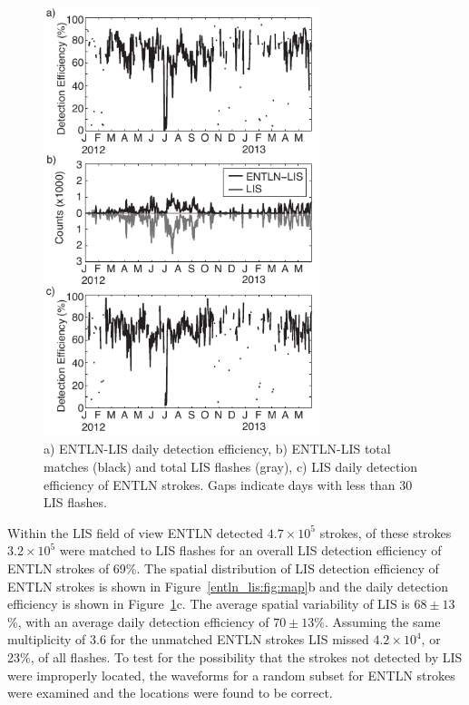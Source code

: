 \begin{figure}[t]
   \centering
   \noindent\includegraphics[width=19pc,angle=0]{entln_lis/Figures/de.pdf}
   \caption{a) ENTLN-LIS daily detection efficiency,
   		b) ENTLN-LIS total matches (black) and total LIS flashes (gray),
		c) LIS daily detection efficiency of ENTLN strokes.
		Gaps indicate days with less than 30 LIS flashes.
		}
   \label{entln_lis:fig:de}
\end{figure}

Within the LIS field of view ENTLN detected $4.7\times10^5$ strokes, of these strokes $3.2\times10^5$ were matched to LIS flashes for an overall LIS detection efficiency of ENTLN strokes of 69\%.
The spatial distribution of LIS detection efficiency of ENTLN strokes is shown in Figure~\ref{entln_lis:fig:map}b and the daily detection efficiency is shown in Figure~\ref{entln_lis:fig:de}c.
The average spatial variability of LIS is $68 \pm 13$\%, with an average daily detection efficiency of $70 \pm 13$\%.
Assuming the same multiplicity of 3.6 for the unmatched ENTLN strokes LIS missed $4.2\times10^4$, or 23\%, of all flashes.
To test for the possibility that the strokes not detected by LIS were improperly located, the waveforms for a random subset for ENTLN strokes were examined and the locations were found to be correct.


